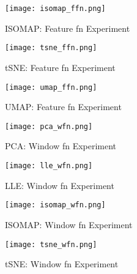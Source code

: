 \documentclass[conference]{IEEEtran}
\begin{document}
\begin{figure}[htbp]
    \centerline{\texttt{[image: isomap\_ffn.png]}}
    \caption[This is the caption; This is the second line]
        {ISOMAP: Feature fn Experiment \endtabular}
    \label{fig:isomap_ffn}
\end{figure}

\begin{figure}[htbp]
    \centerline{\texttt{[image: tsne\_ffn.png]}}
    \caption[This is the caption; This is the second line]
        {tSNE: Feature fn Experiment \endtabular}
    \label{fig:tsne_ffn}
\end{figure}

\begin{figure}[htbp]
    \centerline{\texttt{[image: umap\_ffn.png]}}
    \caption[This is the caption; This is the second line]
        {UMAP: Feature fn Experiment \endtabular}
    \label{fig:umap_ffn}
\end{figure}


\begin{figure}[htbp]
    \centerline{\texttt{[image: pca\_wfn.png]}}
    \caption[This is the caption; This is the second line]
        {PCA: Window fn Experiment \endtabular}
    \label{fig:pca_wfn}
\end{figure}

\begin{figure}[htbp]
    \centerline{\texttt{[image: lle\_wfn.png]}}
    \caption[This is the caption; This is the second line]
        {LLE: Window fn Experiment \endtabular}
    \label{fig:lle_wfn}
\end{figure}

\begin{figure}[htbp]
    \centerline{\texttt{[image: isomap\_wfn.png]}}
    \caption[This is the caption; This is the second line]
        {ISOMAP: Window fn Experiment \endtabular}
    \label{fig:isomap_wfn}
\end{figure}

\begin{figure}[htbp]
    \centerline{\texttt{[image: tsne\_wfn.png]}}
    \caption[This is the caption; This is the second line]
        {tSNE: Window fn Experiment \endtabular}
    \label{fig:tsne_wfn}
\end{figure}
\end{document}
